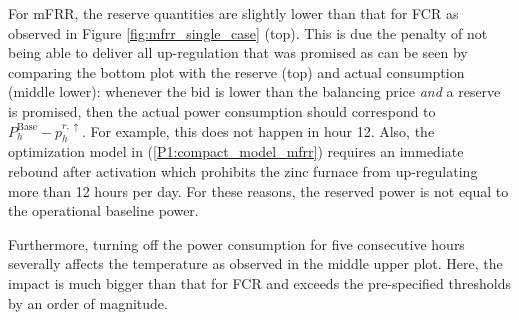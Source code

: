 \documentclass[sigconf]{acmart}
\begin{document}
For mFRR, the reserve quantities are slightly lower than that for FCR as observed in Figure \ref{fig:mfrr_single_case} (top). This is due the penalty of not being able to deliver all up-regulation that was promised as can be seen by comparing the bottom plot with the reserve (top) and actual consumption (middle lower): whenever the bid is lower than the balancing price \textit{and} a reserve is promised, then the actual power consumption should correspond to $P^{\text{Base}}_{h} - p_{h}^{r, \uparrow}$. For example, this does not happen in hour 12. Also, the optimization model in (\ref{P1:compact_model_mfrr}) requires an immediate rebound after activation which prohibits the zinc furnace from up-regulating more than 12 hours per day. For these reasons, the reserved power is not equal to the operational baseline power.

Furthermore, turning off the power consumption for five consecutive hours severally affects the temperature as observed in the middle upper plot. Here, the impact is much bigger than that for FCR and exceeds the pre-specified thresholds by an order of magnitude.
\end{document}
